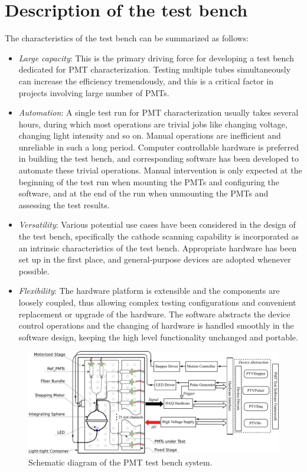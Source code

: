\documentclass{JINST}
\begin{document}
\section{Description of the test bench}
\label{sec:description}

The characteristics of the test bench can be summarized as follows:
\begin{itemize}
	\item \textit{Large capacity}: This is the primary driving force for developing a test bench dedicated for PMT characterization.
	Testing multiple tubes simultaneously can increase the efficiency tremendously, and this is a critical factor in projects involving large number of PMTs. 
	\item \textit{Automation}: A single test run for PMT characterization usually takes several hours, during which most operations are trivial jobs like changing voltage, changing light intensity and so on.
	Manual operations are inefficient and unreliable in such a long period.
	Computer controllable hardware is preferred in building the test bench, and corresponding software has been developed to automate these trivial operations.
	Manual intervention is only expected at the beginning of the test run when mounting the PMTs and configuring the software, and at the end of the run when unmounting the PMTs and assessing the test results.
	\item \textit{Versatility}: Various potential use cases have been considered in the design of the test bench, specifically the cathode scanning capability is incorporated as an intrinsic characteristics of the test bench.
	Appropriate hardware has been set up in the first place, and general-purpose devices are adopted whenever possible.
	\item \textit{Flexibility}: %
	The hardware platform is extensible and the components are loosely coupled, thus allowing complex testing configurations and convenient replacement or upgrade of the hardware.
	The software abstracts the device control operations and the changing of hardware is handled smoothly in the software design, keeping the high level functionality unchanged and portable. 
\end{itemize}

\begin{figure}[tbp]
	\centering
	\includegraphics[width=\textwidth]{FIG1}
	\caption{Schematic diagram of the PMT test bench system.}
	\label{fig:FIG1}
\end{figure}
\end{document}

